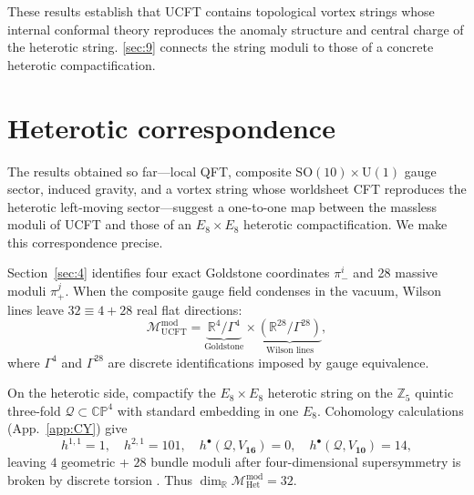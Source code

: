 \documentclass[pdflatex,sn-mathphys-num]{sn-jnl}
\theoremstyle{thmstyleone}
\theoremstyle{thmstyletwo}%
\theoremstyle{thmstylethree}%
\newcommand{\SO}[1]{\mathrm{SO(#1)}}
\newcommand{\U}[1]{\mathrm{U(#1)}}
\newcommand{\SOTen}{\SO{10}}
\newcommand{\UOne}{\U{1}}
\begin{document}
\bigskip
These results establish that UCFT contains topological vortex strings
whose internal conformal theory reproduces the anomaly structure and
central charge of the heterotic string. \autoref{sec:9} connects
the string moduli to those of a concrete heterotic compactification.

\section{Heterotic correspondence}
\label{sec:9}
The results obtained so far---local QFT, composite
\(\SOTen\times \UOne\) gauge sector, induced gravity, and a vortex string
whose worldsheet CFT reproduces the heterotic left-moving sector---suggest
a one-to-one map between the massless moduli of UCFT and those of an
\(E_{8}\times E_{8}\) heterotic compactification.  We make this
correspondence precise.

Section~\ref{sec:4} identifies four exact Goldstone coordinates
\(\pi_-^{i}\) and 28 massive moduli \(\pi_+^{j}\).
When the composite gauge field condenses in the vacuum,
Wilson lines leave \(32\equiv 4+28\) real flat directions:
\begin{equation}
  \mathcal{M}_{\mathrm{UCFT}}^{\mathrm{mod}}
  = \underbrace{\mathbb R^{4}/\Gamma^{4}}_{\text{Goldstone}}
    \times
    \underbrace{(\mathbb R^{28}/\Gamma^{28})}_{\text{Wilson lines}},
\end{equation}
where \(\Gamma^{4}\) and \(\Gamma^{28}\) are discrete identifications
imposed by gauge equivalence.

On the heterotic side, compactify the \(E_{8}\times E_{8}\) heterotic string on the
\(\mathbb Z_{5}\) quintic three-fold
\(\mathcal Q\subset\mathbb{CP}^{4}\) with standard embedding in one
\(E_{8}\).  Cohomology calculations (App.~\ref{app:CY}) give
\[
  h^{1,1}=1,\quad h^{2,1}=101,\quad
  h^{\bullet}(\mathcal Q,V_{\mathbf{16}})=0,\quad
  h^{\bullet}(\mathcal Q,V_{\mathbf{10}})=14,
\]
leaving \(4\) geometric + \(28\) bundle moduli after
four-dimensional supersymmetry is broken by discrete torsion
\cite{Witten:1995}.  Thus
\(\dim_{\mathbb R}\mathcal{M}_{\mathrm{Het}}^{\text{mod}} = 32\).
\end{document}
